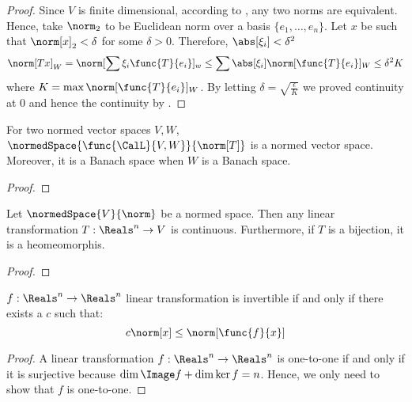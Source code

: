 \begin{proof}
    Since \(V\) is finite dimensional, according to , any two norms are equivalent. Hence, take \(\norm_2\) to be Euclidean norm over a basis \(\{e_1, \dots , e_n\}\). Let \(x\) be such that \(\norm[x]_2 < \delta\) for some \(\delta > 0\). Therefore, \(\abs[\xi_i] < \delta^2\)
    \begin{equation*}
        \norm[Tx]_W = \norm[\sum \xi_i \func{T}{e_i}]_w \leq \sum \abs[\xi_i] \norm[\func{T}{e_i}]_W \leq \delta^2 K
    \end{equation*}
    where \(K = \max \norm[\func{T}{e_i}]_W \). By letting \(\delta = \sqrt{\frac{\epsilon}{K}}\) we proved continuity at \(0\) and hence the continuity by .
\end{proof}

\begin{theorem}
    For two normed vector spaces \(V,W\), \(\normedSpace{\func{\CalL}{V,W}}{\norm[T]}\) is a normed vector space. Moreover, it is a Banach space when \(W\) is a Banach space.
\end{theorem}

\begin{proof}

\end{proof}

\begin{theorem}
    Let \(\normedSpace{V}{\norm}\) be a normed space. Then any linear transformation \(T: \Reals^n \to V\) is continuous. Furthermore, if \(T\) is a bijection, it is a heomeomorphis.
\end{theorem}
\begin{proof}

\end{proof}

\begin{theorem}
    \(f : \Reals^n \to \Reals^n\) linear transformation is invertible if and only if there exists a \(c\) such that:
    \begin{equation*}
        c \norm[x] \leq \norm[\func{f}{x}]
    \end{equation*}
\end{theorem}

\begin{proof}
    A linear transformation \(f: \Reals^n \to \Reals^n\) is one-to-one if and only if it is surjective because \(\dim \Image f + \dim \ker f = n\). Hence, we only need to show that \(f\) is one-to-one.
\end{proof}

